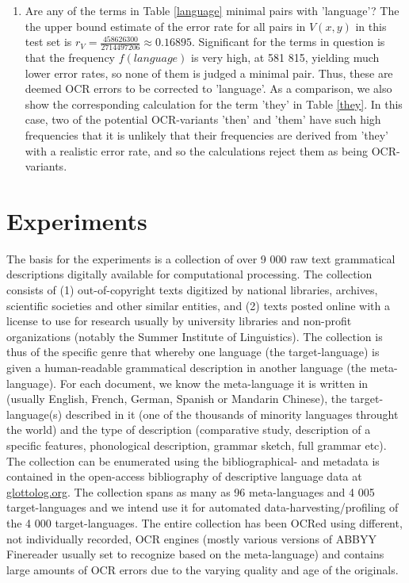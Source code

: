 \documentclass{sig-alternate}
\begin{document}
\begin{enumerate}
\item Are any of the terms in Table \ref{language} minimal pairs with
  'language'?  The the upper bound estimate of the error rate for all
  pairs in $V(x, y)$ in this test set is $r_V =
  \frac{458626300}{2714497206} \approx 0.16895$. Significant for the
  terms in question is that the frequency $f(language)$ is very high,
  at 581 815, yielding much lower error rates, so none of them is
  judged a minimal pair. Thus, these are deemed OCR errors to be
  corrected to 'language'. As a comparison, we also show the
  corresponding calculation for the term 'they' in Table \ref{they}.
  In this case, two of the potential OCR-variants 'then' and 'them'
  have such high frequencies that it is unlikely that their
  frequencies are derived from 'they' with a realistic error rate, and
  so the calculations reject them as being OCR-variants.
 \end{enumerate}

\section{Experiments}
\label{expeval}
The basis for the experiments is a collection of over 9 000 raw text
grammatical descriptions digitally available for computational
processing. The collection consists of (1) out-of-copyright texts
digitized by national libraries, archives, scientific societies and
other similar entities, and (2) texts posted online with a license to
use for research usually by university libraries and non-profit
organizations (notably the Summer Institute of Linguistics). The
collection is thus of the specific genre that whereby one language
(the target-language) is given a human-readable grammatical
description in another language (the meta-language). For each
document, we know the meta-language it is written in (usually English,
French, German, Spanish or Mandarin Chinese), the target-language(s)
described in it (one of the thousands of minority languages throught
the world) and the type of description (comparative study, description
of a specific features, phonological description, grammar sketch, full
grammar etc). The collection can be enumerated using the
bibliographical- and metadata is contained in the open-access
bibliography of descriptive language data at \url{glottolog.org}. The
collection spans as many as 96 meta-languages and 4 005
target-languages and we intend use it for automated
data-harvesting/profiling of the 4 000 target-languages. The entire
collection has been OCRed using different, not individually recorded,
OCR engines (mostly various versions of ABBYY Finereader usually set
to recognize based on the meta-language) and contains large amounts of
OCR errors due to the varying quality and age of the originals.
\end{document}
